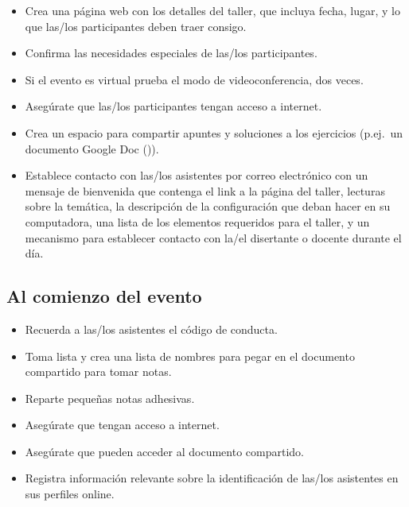 \begin{itemize}

\item
  Crea una página web con los detalles del taller,
  que incluya fecha,
  lugar,
  y lo que las/los participantes deben traer consigo.

\item
  Confirma las necesidades especiales de las/los participantes.

\item
  Si el evento es virtual prueba el modo de videoconferencia, dos veces.

\item
  Asegúrate que las/los participantes tengan acceso a internet.

\item
  Crea un espacio para compartir apuntes y soluciones a los ejercicios (p.ej.\ un documento Google Doc ()).

\item
  Establece contacto con las/los asistentes por correo electrónico con un mensaje de bienvenida que contenga
  el link a la página del taller,
  lecturas sobre la temática,
  la descripción de la configuración que deban hacer en su computadora,
  una lista de los elementos requeridos para el taller,
  y un mecanismo para establecer contacto con la/el disertante o docente durante el día.

\end{itemize}

\subsection*{Al comienzo del evento}

\begin{itemize}

\item
  Recuerda a las/los asistentes el código de conducta.

\item
  Toma lista
  y crea una lista de nombres para pegar en el documento compartido para tomar notas.

\item
  Reparte pequeñas notas adhesivas.

\item
  Asegúrate que tengan acceso a internet.
  
\item
  Asegúrate que pueden acceder al documento compartido.

\item
  Registra información relevante sobre la identificación de las/los asistentes en sus perfiles online.

\end{itemize}

